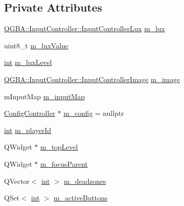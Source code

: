 \subsection*{Private Attributes}
\begin{DoxyCompactItemize}
\item 
\mbox{\hyperlink{struct_q_g_b_a_1_1_input_controller_1_1_input_controller_lux}{Q\+G\+B\+A\+::\+Input\+Controller\+::\+Input\+Controller\+Lux}} \mbox{\hyperlink{class_q_g_b_a_1_1_input_controller_a64bcd196165bca558a364db3649165df}{m\+\_\+lux}}
\item 
uint8\+\_\+t \mbox{\hyperlink{class_q_g_b_a_1_1_input_controller_a3c8bdf5a37cd0529ffa6deeab881dc60}{m\+\_\+lux\+Value}}
\item 
\mbox{\hyperlink{ioapi_8h_a787fa3cf048117ba7123753c1e74fcd6}{int}} \mbox{\hyperlink{class_q_g_b_a_1_1_input_controller_a74e93263faf2344a2c8f20f88fe5a097}{m\+\_\+lux\+Level}}
\item 
\mbox{\hyperlink{struct_q_g_b_a_1_1_input_controller_1_1_input_controller_image}{Q\+G\+B\+A\+::\+Input\+Controller\+::\+Input\+Controller\+Image}} \mbox{\hyperlink{class_q_g_b_a_1_1_input_controller_a0badd3f84e0fb9702a2c692d4e3efea4}{m\+\_\+image}}
\item 
m\+Input\+Map \mbox{\hyperlink{class_q_g_b_a_1_1_input_controller_a7b2d0ef2dcef0947f4069941ff4fb835}{m\+\_\+input\+Map}}
\item 
\mbox{\hyperlink{class_q_g_b_a_1_1_config_controller}{Config\+Controller}} $\ast$ \mbox{\hyperlink{class_q_g_b_a_1_1_input_controller_af66f725cd21bdcfabc0709975b931fda}{m\+\_\+config}} = nullptr
\item 
\mbox{\hyperlink{ioapi_8h_a787fa3cf048117ba7123753c1e74fcd6}{int}} \mbox{\hyperlink{class_q_g_b_a_1_1_input_controller_a7e8b61aaad12cbc612a1174ba20acb8e}{m\+\_\+player\+Id}}
\item 
Q\+Widget $\ast$ \mbox{\hyperlink{class_q_g_b_a_1_1_input_controller_a4d15dbce75540ad09ca1d2ca55ec9fb5}{m\+\_\+top\+Level}}
\item 
Q\+Widget $\ast$ \mbox{\hyperlink{class_q_g_b_a_1_1_input_controller_a27ce5197495cd1bfe1ee72159c2de289}{m\+\_\+focus\+Parent}}
\item 
Q\+Vector$<$ \mbox{\hyperlink{ioapi_8h_a787fa3cf048117ba7123753c1e74fcd6}{int}} $>$ \mbox{\hyperlink{class_q_g_b_a_1_1_input_controller_adff432e811522ddf127c76bd01509675}{m\+\_\+deadzones}}
\item 
Q\+Set$<$ \mbox{\hyperlink{ioapi_8h_a787fa3cf048117ba7123753c1e74fcd6}{int}} $>$ \mbox{\hyperlink{class_q_g_b_a_1_1_input_controller_ad7dfc2b38d0d9379a1ff71552abcb308}{m\+\_\+active\+Buttons}}

\end{DoxyCompactItemize}
